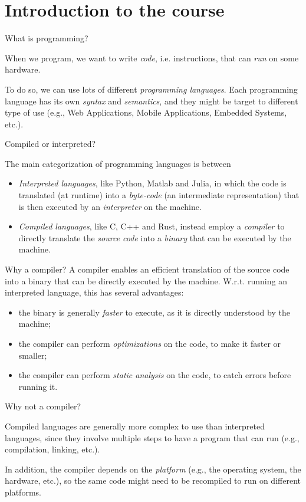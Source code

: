 \section{Introduction to the course}
\begin{frame}{What is programming?}

    When we program, we want to write \emph{code}, i.e. instructions, that can \emph{run} on some hardware.

    To do so, we can use lots of different \emph{programming languages}. 
    Each programming language has its own \textit{syntax} and \textit{semantics}, and they might be target to different type of use (e.g.,  Web Applications, Mobile Applications, Embedded Systems, etc.).

\end{frame}

\begin{frame}{Compiled or interpreted?}

    The main categorization of programming languages is between
    \begin{itemize}
        \item \emph{Interpreted languages}, like Python, Matlab and Julia, in which the code is translated (at runtime) into a \textit{byte-code} (an intermediate representation) that is then executed by an \textit{interpreter} on the machine.
        \item \emph{Compiled languages}, like C, C++ and Rust, instead employ a \emph{compiler} to directly translate the \textit{source code} into a \textit{binary} that can be executed by the machine.
    \end{itemize}

\end{frame}


\begin{frame}{Why a compiler?}
    A compiler enables an efficient translation of the source code into a binary that can be directly executed by the machine. 
    W.r.t. running an interpreted language, this has several advantages:
    \begin{itemize}
        \item the binary is generally \emph{faster} to execute, as it is directly understood by the machine;
        \item the compiler can perform \emph{optimizations} on the code, to make it faster or smaller;
        \item the compiler can perform \emph{static analysis} on the code, to catch errors before running it.
    \end{itemize}
\end{frame}

\begin{frame}{Why not a compiler?}

    Compiled languages are generally more complex to use than interpreted languages, since they involve multiple steps to have a program that can run (e.g., compilation, linking, etc.). 

    In addition, the compiler depends on the \emph{platform} (e.g., the operating system, the hardware, etc.), so the same code might need to be recompiled to run on different platforms.
\end{frame}
